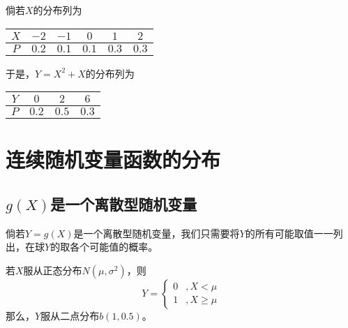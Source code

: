 \begin{example}
倘若$X$的分布列为
\begin{table}[ht]
    \centering
    \begin{tabular}{c|ccccc}
         $X$& $-2$ & $-1$ & $0$ & $1$ & $2$ \\
         \hline
         $P$& $0.2$ &  $0.1$ &  $0.1$ &  $0.3$ & $0.3$\\
    \end{tabular}
\end{table}

于是，$Y=X^{2}+X$的分布列为

    \centering
    \begin{tabular}{c|ccc}
         $Y$&  $0$ & $2$ & $6$ \\
         \hline
         $P$&   $0.2$ &  $0.5$ & $0.3$\\
    \end{tabular}
\end{example}
\begin{note}
\vspace{3cm}
\end{note}

\section{连续随机变量函数的分布}
\subsection{$g(X)$是一个离散型随机变量}
倘若$Y=g(X)$是一个离散型随机变量，我们只需要将$Y$的所有可能取值一一列出，在球$Y$的取各个可能值的概率。
\begin{example}
    若$X$服从正态分布$N(\mu,\sigma^2)$，则
    $$
    Y=\left\{\begin{matrix}
    0&,X<\mu \\
    1&,X\ge \mu
    \end{matrix}\right.
    $$
    那么，$Y$服从二点分布$b(1,0.5)$。
\end{example}
